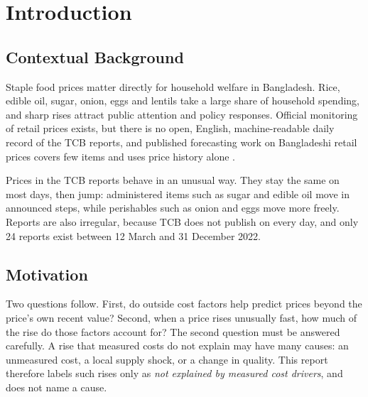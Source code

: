 \documentclass[12pt]{report}
\newcommand{\unexpl}{\emph{not explained by measured cost drivers}}
\begin{document}
\newpage
\renewcommand*\contentsname{Table of Contents}
\tableofcontents

\listoffigures
\listoftables
{}

\chapter{Introduction}

\justifying

\section{Contextual Background}
Staple food prices matter directly for household welfare in Bangladesh. Rice, edible oil, sugar, onion, eggs and lentils take a large share of household spending, and sharp rises attract public attention and policy responses. Official monitoring of retail prices exists, but there is no open, English, machine-readable daily record of the TCB reports, and published forecasting work on Bangladeshi retail prices covers few items and uses price history alone \cite{agripricebd}.

Prices in the TCB reports behave in an unusual way. They stay the same on most days, then jump: administered items such as sugar and edible oil move in announced steps, while perishables such as onion and eggs move more freely. Reports are also irregular, because TCB does not publish on every day, and only 24 reports exist between 12 March and 31 December 2022.

\section{Motivation}
Two questions follow. First, do outside cost factors help predict prices beyond the price's own recent value? Second, when a price rises unusually fast, how much of the rise do those factors account for? The second question must be answered carefully. A rise that measured costs do not explain may have many causes: an unmeasured cost, a local supply shock, or a change in quality. This report therefore labels such rises only as \unexpl, and does not name a cause.
\end{document}

